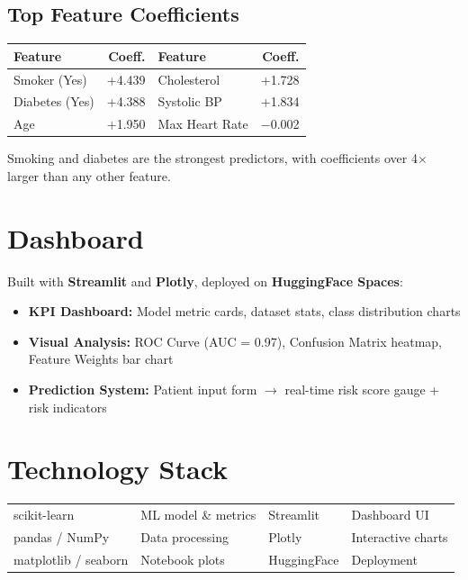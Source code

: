 \documentclass[12pt, a4paper]{article}
\begin{document}
\subsection{Top Feature Coefficients}
\begin{table}[H]
\centering\small
\begin{tabular}{lr|lr}
\toprule
\textbf{Feature} & \textbf{Coeff.} & \textbf{Feature} & \textbf{Coeff.} \\
\midrule
Smoker (Yes)   & +4.439 & Cholesterol    & +1.728 \\
Diabetes (Yes) & +4.388 & Systolic BP    & +1.834 \\
Age            & +1.950 & Max Heart Rate & $-$0.002 \\
\bottomrule
\end{tabular}
\end{table}

Smoking and diabetes are the strongest predictors, with coefficients over 4$\times$ larger than any other feature.

\section{Dashboard}
Built with \textbf{Streamlit} and \textbf{Plotly}, deployed on \textbf{HuggingFace Spaces}:

\begin{itemize}[noitemsep, topsep=4pt]
    \item \textbf{KPI Dashboard:} Model metric cards, dataset stats, class distribution charts
    \item \textbf{Visual Analysis:} ROC Curve (AUC = 0.97), Confusion Matrix heatmap, Feature Weights bar chart
    \item \textbf{Prediction System:} Patient input form $\rightarrow$ real-time risk score gauge + risk indicators
\end{itemize}

\section{Technology Stack}
\begin{table}[H]
\centering\small
\begin{tabular}{ll|ll}
\toprule
scikit-learn & ML model \& metrics & Streamlit & Dashboard UI \\
pandas / NumPy & Data processing & Plotly & Interactive charts \\
matplotlib / seaborn & Notebook plots & HuggingFace & Deployment \\
\bottomrule
\end{tabular}
\end{table}
\end{document}
